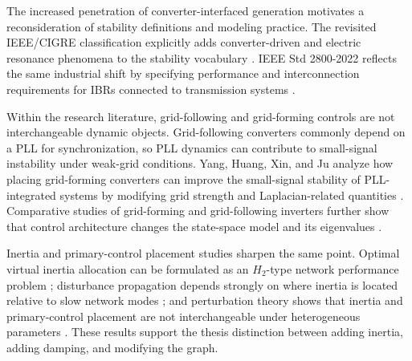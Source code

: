 The increased penetration of converter-interfaced generation motivates a
reconsideration of stability definitions and modeling practice. The revisited
IEEE/CIGRE classification explicitly adds converter-driven and electric
resonance phenomena to the stability vocabulary
\cite{hatziargyriou2021stability}. IEEE Std 2800-2022 reflects the same
industrial shift by specifying performance and interconnection requirements for
IBRs connected to transmission systems \cite{ieee2800_2022}.

Within the research literature, grid-following and grid-forming controls are
not interchangeable dynamic objects. Grid-following converters commonly depend
on a PLL for synchronization, so PLL dynamics can contribute to small-signal
instability under weak-grid conditions. Yang, Huang, Xin, and Ju analyze how
placing grid-forming converters can improve the small-signal stability of
PLL-integrated systems by modifying grid strength and Laplacian-related
quantities \cite{yang2021gfm}. Comparative studies of grid-forming and
grid-following inverters further show that control architecture changes the
state-space model and its eigenvalues \cite{ding2021comparative}.

Inertia and primary-control placement studies sharpen the same point. Optimal
virtual inertia allocation can be formulated as an \(H_2\)-type network
performance problem \cite{poolla2017virtual}; disturbance propagation depends
strongly on where inertia is located relative to slow network modes
\cite{pagnier2019inertia_location}; and perturbation theory shows that inertia
and primary-control placement are not interchangeable under heterogeneous
parameters \cite{pagnier2019optimal}. These results support the thesis
distinction between adding inertia, adding damping, and modifying the graph.

